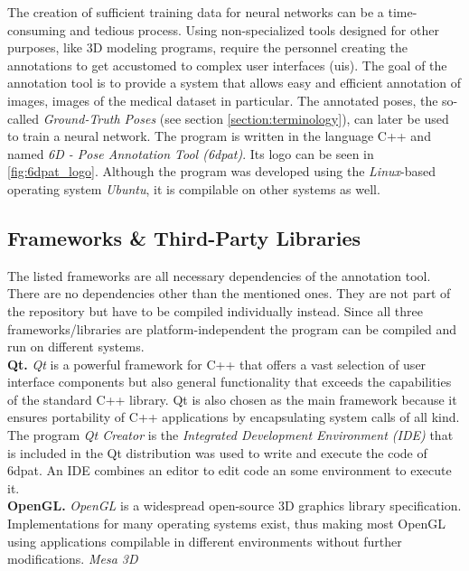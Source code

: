 The creation of sufficient training data for neural networks can be a time-consuming and tedious process. Using non-specialized tools designed for other purposes, like 3D modeling programs, require the personnel creating the annotations to get accustomed to complex user interfaces (\gls{ui}s). The goal of the annotation tool is to provide a system that allows easy and efficient annotation of images, images of the medical dataset in particular. The annotated poses, the so-called \textit{Ground-Truth Poses} (see section \ref{section:terminology}), can later be used to train a neural network. The program is written in the language C++ and named \textit{6D - Pose Annotation Tool (\gls{6dpat})}. Its logo can be seen in \fig \ref{fig:6dpat_logo}. Although the program was developed using the \textit{Linux}-based operating system \textit{Ubuntu}, it is compilable on other systems as well.

\subsection{Frameworks \& Third-Party Libraries}

The listed frameworks are all necessary dependencies of the annotation tool. There are no dependencies other than the mentioned ones. They are not part of the repository but have to be compiled individually instead. Since all three frameworks/libraries are platform-independent the program can be compiled and run on different systems. \\

\noindent\textbf{Qt.} \textit{Qt} \cite{qt} is a powerful framework for C++ that offers a vast selection of user interface components but also general functionality that exceeds the capabilities of the standard C++ library. Qt is also chosen as the main framework because it ensures portability of C++ applications by encapsulating system calls of all kind. The program \textit{Qt Creator} is the \textit{Integrated Development Environment (IDE)} that is included in the Qt distribution was used to write and execute the code of \gls{6dpat}. An IDE combines an editor to edit code an some environment to execute it. \\

\noindent\textbf{OpenGL.} \textit{OpenGL} \cite{opengl} is a widespread open-source 3D graphics library specification. Implementations for many operating systems exist, thus making most OpenGL using applications compilable in different environments without further modifications. \textit{Mesa 3D} \\


